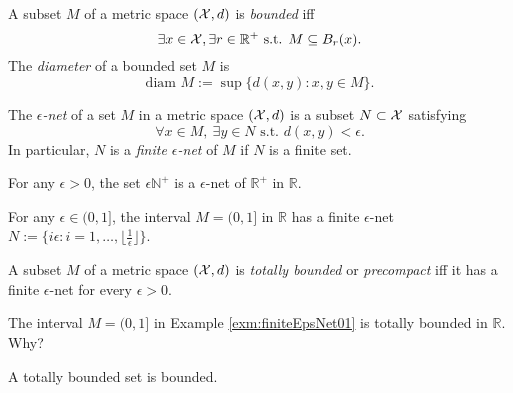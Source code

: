 \begin{defn}
  \label{def:Boundedness}
  A subset $M$ of a metric space $({\cal X},d)$
  is \emph{bounded} iff
  \begin{equation}
    \label{eq:bounded}
    \exists x\in{\cal X}, \exists r\in \mathbb{R}^+
    \text{ s.t. } M \subseteq B_r(x).
  \end{equation}
  The \emph{diameter} of a bounded set $M$ is
  \begin{equation}
    \label{eq:diameter}
    \text{diam } M := \sup\{d(x,y): x,y\in M\}.
  \end{equation}
\end{defn}

\begin{defn}
  \label{def:epsNet}
  The \emph{$\epsilon$-net} of a set $M$ in a metric space $({\cal X},d)$
  is a subset $N\subset {\cal X}$ satisfying
  \begin{equation}
    \label{eq:epsNet}
    \forall x\in M,\ \exists y\in N \text{ s.t. }
    d(x,y)<\epsilon. 
  \end{equation}
  In particular,
  $N$ is a \emph{finite $\epsilon$-net} of $M$
  if $N$ is a finite set.
\end{defn}

\begin{exm}
  For any $\epsilon>0$,
  the set $\epsilon\mathbb{N}^+$
  is a $\epsilon$-net of $\mathbb{R}^+$
  in $\mathbb{R}$.
\end{exm}

\begin{exm}
  \label{exm:finiteEpsNet01}
  For any $\epsilon\in(0,1]$,
  the interval $M=(0,1]$ in $\mathbb{R}$
  has a finite $\epsilon$-net 
  $N:=\{i\epsilon: i=1,\ldots,\lfloor\frac{1}{\epsilon}\rfloor\}$.
\end{exm}

\begin{defn}
  \label{def:totalBoundedness}
  A subset $M$ of a metric space $({\cal X},d)$
  is \emph{totally bounded} or \emph{precompact} iff
  it has a finite $\epsilon$-net
  for every $\epsilon>0$. 
\end{defn}

\begin{exm}
  The interval $M=(0,1]$ in Example
  \ref{exm:finiteEpsNet01} is totally bounded in $\mathbb{R}$.
  Why? 
\end{exm}

\begin{lem}
  \label{lem:totalBoundedImpliesBounded}
  A totally bounded set is bounded. 
\end{lem}

